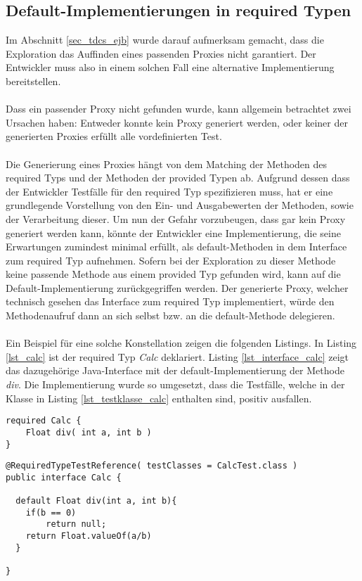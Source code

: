 \subsection{Default-Implementierungen in required Typen}
Im Abschnitt \ref{sec_tdcs_ejb} wurde darauf aufmerksam gemacht, dass die Exploration das Auffinden eines passenden Proxies nicht garantiert. Der Entwickler muss also in einem solchen Fall eine alternative Implementierung bereitstellen.
\\\\
Dass ein passender Proxy nicht gefunden wurde, kann allgemein betrachtet zwei Ursachen haben: Entweder konnte kein Proxy generiert werden, oder keiner der generierten Proxies erfüllt alle vordefinierten Test. 
\\\\
Die Generierung eines Proxies hängt von dem Matching der Methoden des required Typs und der Methoden der provided Typen ab. Aufgrund dessen dass der Entwickler Testfälle für den required Typ spezifizieren muss, hat er eine grundlegende Vorstellung von den Ein- und Ausgabewerten der Methoden, sowie der Verarbeitung dieser. Um nun der Gefahr vorzubeugen, dass gar kein Proxy generiert werden kann, könnte der Entwickler eine Implementierung, die seine Erwartungen zumindest minimal erfüllt, als default-Methoden in dem \Gls{Interface} zum required Typ aufnehmen. Sofern bei der Exploration zu dieser Methode keine passende Methode aus einem provided Typ gefunden wird, kann auf die Default-Implementierung zurückgegriffen werden. Der generierte Proxy, welcher technisch gesehen das \Gls{Interface} zum required Typ implementiert, würde den Methodenaufruf dann an sich selbst bzw. an die default-Methode delegieren.
\\\\
Ein Beispiel für eine solche Konstellation zeigen die folgenden Listings. In Listing \ref{lst_calc} ist der required Typ \emph{Calc} deklariert. Listing \ref{lst_interface_calc} zeigt das dazugehörige Java-Interface mit der default-Implementierung der Methode \emph{div}. Die Implementierung wurde so umgesetzt, dass die Testfälle, welche in der Klasse in Listing \ref{lst_testklasse_calc} enthalten sind, positiv ausfallen.
\begin{lstlisting}[caption={Required Typ \emph{Calc}},captionpos=b, style = dsl, label=lst_calc]
required Calc {
	Float div( int a, int b )	
}
\end{lstlisting}
\begin{lstlisting}[style = java, caption = Interface Calc, captionpos = b, label = lst_interface_calc]
@RequiredTypeTestReference( testClasses = CalcTest.class )
public interface Calc {

  default Float div(int a, int b){
  	if(b == 0)
  		return null;
  	return Float.valueOf(a/b)
  }

}
\end{lstlisting}
